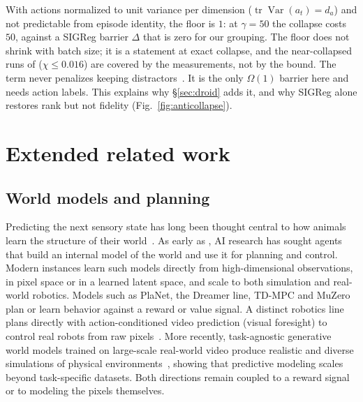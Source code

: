 With actions normalized to unit variance per dimension ($\operatorname{tr}\operatorname{Var}(a_t) = d_a$) and not predictable from episode identity, the floor is $1$: at $\gamma = 50$ the collapse costs $50$, against a SIGReg barrier $\Delta$ that is zero for our grouping. The floor does not shrink with batch size; it is a statement at exact collapse, and the near-collapsed runs of  ($\chi\leq 0.016$) are covered by the measurements, not by the bound. The term never penalizes keeping distractors~\citep{pathak2017curiosity,lamb2023guaranteed,levine2024multistep}. It is the only $\Omega(1)$ barrier here and needs action labels. This explains why \S\ref{sec:droid} adds it, and why SIGReg alone restores rank but not fidelity (Fig.~\ref{fig:anticollapse}).

\section{Extended related work}
\label{app:related-work}

\subsection{World models and planning}
Predicting the next sensory state has long been thought central to how animals learn the
structure of their world~\citep{tolman1948cognitive,rao1999predictive,clark2013whatever}. As early as
\citet{suttonbarto1981adaptive}, AI research has sought agents that build an internal
model of the world and use it for planning and control.
Modern instances learn such models directly from high-dimensional
observations, in pixel space or in a learned latent space, and scale to both
simulation and real-world robotics. Models such as
PlaNet, the Dreamer line, TD-MPC and
MuZero~\citep{haschmidhuber2018worldmodels,watter2015e2c,hafner2019planet,hafner2020dreamer,hafner2023dreamerv3,hansen2022tdmpc,hansen2024tdmpc2,schrittwieser2020muzero,micheli2023iris,janner2022diffuser,wu2022daydreamer}
plan or learn behavior against a reward or value signal. A distinct robotics line plans
directly with action-conditioned video prediction (visual foresight) to control
real robots from raw pixels~\citep{finn2017visualforesight,ebert2018visualforesight}.
More recently, task-agnostic
generative world models trained on large-scale real-world video produce realistic and
diverse simulations of physical
environments~\citep{bruce2024genie,yang2024unisim,brooks2024sora,nvidia2025cosmos,wu2024ivideogpt,du2023unipi},
showing that predictive modeling scales beyond task-specific datasets. Both directions
remain coupled to a reward signal or to modeling the pixels themselves.

